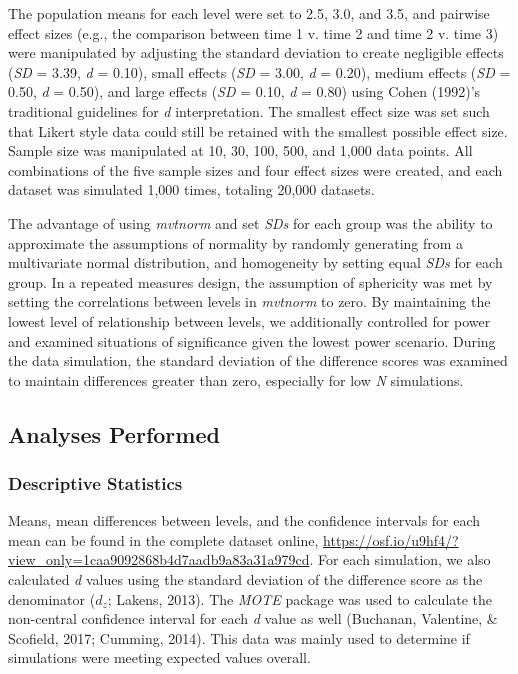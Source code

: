 \documentclass[,man, mask]{apa6}
\begin{document}
The population means for each level were set to 2.5, 3.0, and 3.5, and pairwise effect sizes (e.g., the comparison between time 1 v. time 2 and time 2 v. time 3) were manipulated by adjusting the standard deviation to create negligible effects (\emph{SD} = 3.39, \emph{d} = 0.10), small effects (\emph{SD} = 3.00, \emph{d} = 0.20), medium effects (\emph{SD} = 0.50, \emph{d} = 0.50), and large effects (\emph{SD} = 0.10, \emph{d} = 0.80) using Cohen (1992)'s traditional guidelines for \emph{d} interpretation. The smallest effect size was set such that Likert style data could still be retained with the smallest possible effect size. Sample size was manipulated at 10, 30, 100, 500, and 1,000 data points. All combinations of the five sample sizes and four effect sizes were created, and each dataset was simulated 1,000 times, totaling 20,000 datasets.

The advantage of using \emph{mvtnorm} and set \emph{SDs} for each group was the ability to approximate the assumptions of normality by randomly generating from a multivariate normal distribution, and homogeneity by setting equal \emph{SDs} for each group. In a repeated measures design, the assumption of sphericity was met by setting the correlations between levels in \emph{mvtnorm} to zero. By maintaining the lowest level of relationship between levels, we additionally controlled for power and examined situations of significance given the lowest power scenario. During the data simulation, the standard deviation of the difference scores was examined to maintain differences greater than zero, especially for low \emph{N} simulations.

\hypertarget{analyses-performed}{%
\subsection{Analyses Performed}\label{analyses-performed}}

\hypertarget{descriptive-statistics}{%
\subsubsection{Descriptive Statistics}\label{descriptive-statistics}}

Means, mean differences between levels, and the confidence intervals for each mean can be found in the complete dataset online, \url{https://osf.io/u9hf4/?view_only=1caa9092868b4d7aadb9a83a31a979cd}. For each simulation, we also calculated \emph{d} values using the standard deviation of the difference score as the denominator (\(d_{z}\); Lakens, 2013). The \emph{MOTE} package was used to calculate the non-central confidence interval for each \emph{d} value as well (Buchanan, Valentine, \& Scofield, 2017; Cumming, 2014). This data was mainly used to determine if simulations were meeting expected values overall.
\end{document}
